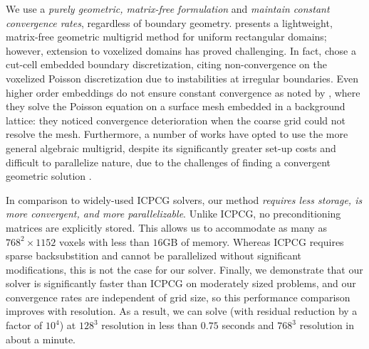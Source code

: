 We use a \emph{purely geometric, matrix-free formulation} and \emph{maintain constant convergence rates}, regardless of boundary geometry.  \cite{BWR05} presents a lightweight, matrix-free geometric multigrid method for uniform rectangular domains; however, extension to voxelized domains has proved challenging.  In fact, \cite{HMB05} chose a cut-cell embedded boundary discretization, citing non-convergence on the voxelized Poisson discretization due to instabilities at irregular boundaries.  Even higher order embeddings do not ensure constant convergence as noted by \cite{CLB09}, where they solve the Poisson equation on a surface mesh embedded in a background lattice: they noticed convergence deterioration when the coarse grid could not resolve the mesh.  Furthermore, a number of works have opted to use the more general algebraic multigrid, despite its significantly greater set-up costs and difficult to parallelize nature\cite{trottenberg:2001:multigrid}, due to the challenges of finding a convergent geometric solution \cite{CNF07, CGR04, PM04}.

In comparison to widely-used ICPCG solvers, our method \emph{requires less storage, is more convergent, and more parallelizable}.  Unlike ICPCG, no preconditioning matrices are explicitly stored.  This allows us to accommodate as many as $768^2\!\times\!1152$ voxels with less than $16$GB of memory. Whereas ICPCG requires sparse backsubstition and cannot be parallelized without significant modifications, this is not the case for our solver.  Finally, we demonstrate that our solver is significantly faster than ICPCG on moderately sized problems, and our convergence rates are independent of grid size, so this performance comparison improves with resolution.  As a result, we can solve (with residual reduction by a factor of $10^4$) at $128^3$ resolution in less than $0.75$ seconds and $768^3$ resolution in about a minute.


